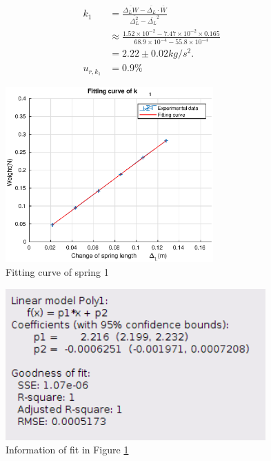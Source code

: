     \begin{figure}[h]    
        \begin{minipage}{0.5\linewidth}
            \[
            \begin{split}
                k_1&=\frac{\overline{\Delta_LW}-\overline{\Delta_L}\cdot\overline{W}}{\overline{\Delta_L^2}-\overline{\Delta_L}^2}\\[0.2cm]
                &\approx \frac{1.52\times10^{-2}-7.47\times10^{-2}\times0.165}{68.9\times10^{-4}-55.8\times10^{-4}}\\[0.2cm]
                &=2.22\pm 0.02kg/s^2.\\[0.4cm]
                u_{r,k_1}&=0.9\%
            \end{split}
            \]
        \end{minipage}
        \begin{minipage}{0.4\linewidth}
            \centering
            \includegraphics[height=6.7cm]{images/k1.eps}
            \caption{Fitting curve of spring 1}\label{k_1}
        \end{minipage}
    \end{figure}
    \newpage
    \begin{figure}[!h]
        \centering
        \includegraphics[height=5.8cm]{images/k1info.png}
        \caption{Information of fit in Figure \ref{k_1}}\label{k1info}
    \end{figure}
